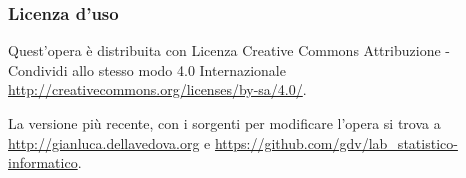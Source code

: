 




\begin{frame}[containsverbatim]\frametitle{Licenza d'uso}
  \small
Quest'opera è distribuita con Licenza Creative Commons
Attribuzione - Condividi allo stesso modo 4.0 Internazionale
\url{http://creativecommons.org/licenses/by-sa/4.0/}.

La versione più recente, con i sorgenti per modificare l'opera si trova
a \url{http://gianluca.dellavedova.org} e
\url{https://github.com/gdv/lab_statistico-informatico}.

\end{frame}






